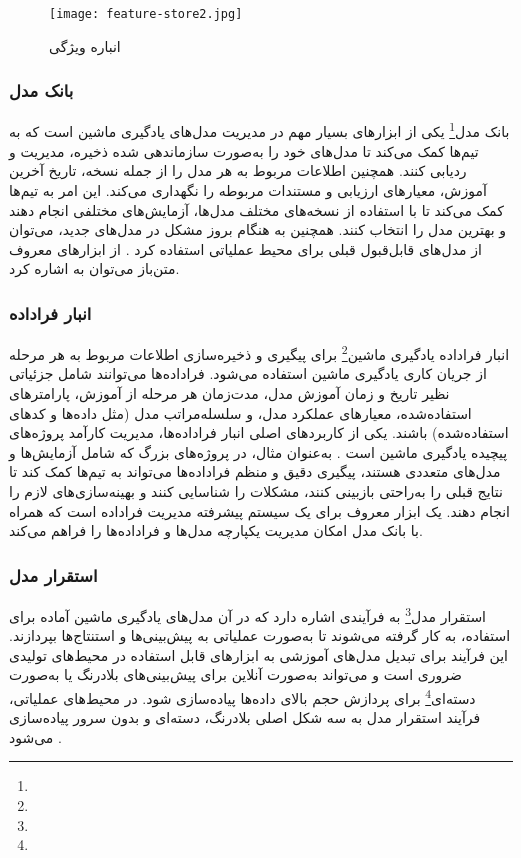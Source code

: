 \begin{figure}[t]
	\centering
	\texttt{[image: feature-store2.jpg]}
	\caption{انباره ویژگی}
	\label{fig: feature store}
\end{figure}


\subsubsection{بانک مدل}
بانک مدل\footnote{} یکی از ابزارهای بسیار مهم در مدیریت مدل‌های یادگیری ماشین است که به تیم‌ها کمک می‌کند تا مدل‌های خود را به‌صورت سازماندهی شده ذخیره، مدیریت و ردیابی کنند. همچنین اطلاعات مربوط به هر مدل را از جمله نسخه، تاریخ آخرین آموزش، معیارهای ارزیابی و مستندات مربوطه را نگهداری می‌کند. این امر به تیم‌ها کمک می‌کند تا با استفاده از نسخه‌های مختلف مدل‌ها، آزمایش‌های مختلفی انجام دهند و بهترین مدل را انتخاب کنند. همچنین به هنگام بروز مشکل در مدل‌های جدید، می‌توان از مدل‌های قابل‌قبول قبلی برای محیط عملیاتی استفاده کرد \cite{MLOpsCloud1}. از ابزارهای معروف متن‌باز می‌توان به \cite{MLflow} اشاره کرد.


\subsubsection{انبار فراداده}
انبار فراداده یادگیری ماشین\footnote{} برای پیگیری و ذخیره‌سازی اطلاعات مربوط به هر مرحله از جریان کاری یادگیری ماشین استفاده می‌شود. فراداده‌ها می‌توانند شامل جزئیاتی نظیر تاریخ و زمان آموزش مدل، مدت‌زمان هر مرحله از آموزش، پارامترهای استفاده‌شده، معیارهای عملکرد مدل، و سلسله‌مراتب مدل (مثل داده‌ها و کدهای استفاده‌شده) باشند. یکی از کاربردهای اصلی انبار فراداده‌ها، مدیریت کارآمد پروژه‌های پیچیده یادگیری ماشین است \cite{MLOpsProd2}. به‌عنوان مثال، در پروژه‌های بزرگ که شامل آزمایش‌ها و مدل‌های متعددی هستند، پیگیری دقیق و منظم فراداده‌ها می‌تواند به تیم‌ها کمک کند تا نتایج قبلی را به‌راحتی بازبینی کنند، مشکلات را شناسایی کنند و بهینه‌سازی‌های لازم را انجام دهند.  یک ابزار معروف برای یک سیستم پیشرفته مدیریت فراداده است که همراه با بانک مدل امکان مدیریت یکپارچه مدل‌ها و فراداده‌ها را فراهم می‌کند.

\subsubsection{استقرار مدل}
استقرار مدل\footnote{} به فرآیندی اشاره دارد که در آن مدل‌های یادگیری ماشین آماده برای استفاده، به کار گرفته می‌شوند تا به‌صورت عملیاتی به پیش‌بینی‌ها و استنتاج‌ها بپردازند. این فرآیند برای تبدیل مدل‌های آموزشی به ابزارهای قابل استفاده در محیط‌های تولیدی ضروری است و می‌تواند به‌صورت آنلاین برای پیش‌بینی‌های بلادرنگ یا به‌صورت دسته‌ای\footnote{} برای پردازش حجم بالای داده‌ها پیاده‌سازی شود. در محیط‌های عملیاتی، فرآیند استقرار مدل به سه شکل اصلی بلادرنگ، دسته‌ای و بدون سرور پیاده‌سازی می‌شود \cite{MLOpsCloud1}.

